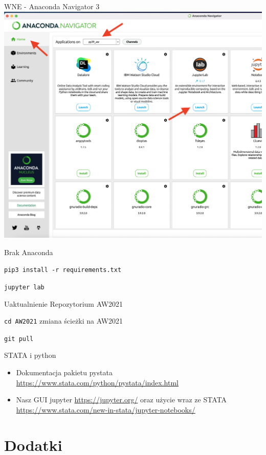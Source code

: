 \documentclass{beamer}
\begin{document}
\begin{frame}{WNE - Anaconda Navigator 3}
  \includegraphics[scale = 0.20]{anaconda_navigator_3.png}
\end{frame}

\begin{frame}{Brak Anaconda}
  \item \texttt{pip3 install -r requirements.txt}
  \item \texttt{jupyter lab}
\end{frame}

\begin{frame}{Uaktualnienie Repozytorium AW2021}
  \item \texttt{cd AW2021} zmiana ścieżki na AW2021
  \item \texttt{git pull}
\end{frame}

\begin{frame}{STATA i python}
  \begin{itemize}
  \item Dokumentacja pakietu pystata \url{https://www.stata.com/python/pystata/index.html}
  \item Nasz GUI jupyter \url{https://jupyter.org/} oraz użycie wraz ze STATA \url{https://www.stata.com/new-in-stata/jupyter-notebooks/}
  \end{itemize}
\end{frame}

\section{Dodatki}
\end{document}
